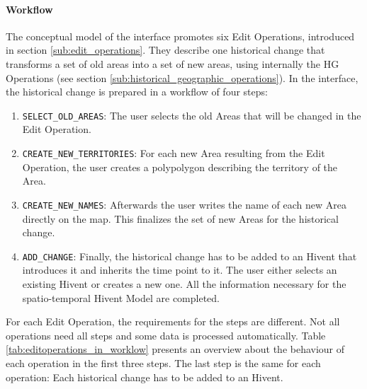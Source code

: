 \paragraph{Workflow} %
\label{par:workflow}

The conceptual model of the interface promotes six Edit Operations, introduced in section \ref{sub:edit_operations}. They describe one historical change that transforms a set of old areas into a set of new areas, using internally the HG Operations (see section \ref{sub:historical_geographic_operations}). In the interface, the historical change is prepared in a workflow of four steps:

\begin{enumerate}
  \item \texttt{SELECT\_OLD\_AREAS}: The user selects the old Areas that will be changed in the Edit Operation.
  \item \texttt{CREATE\_NEW\_TERRITORIES}: For each new Area resulting from the Edit Operation, the user creates a polypolygon describing the territory of the Area.
  \item \texttt{CREATE\_NEW\_NAMES}: Afterwards the user writes the name of each new Area directly on the map. This finalizes the set of new Areas for the historical change.
  \item \texttt{ADD\_CHANGE}: Finally, the historical change has to be added to an Hivent that introduces it and inherits the time point to it. The user either selects an existing Hivent or creates a new one. All the information necessary for the spatio-temporal Hivent Model are completed.
\end{enumerate}

For each Edit Operation, the requirements for the steps are different. Not all operations need all steps and some data is processed automatically. Table \ref{tab:editoperations_in_worklow} presents an overview about the behaviour of each operation in the first three steps. The last step is the same for each operation: Each historical change has to be added to an Hivent.

